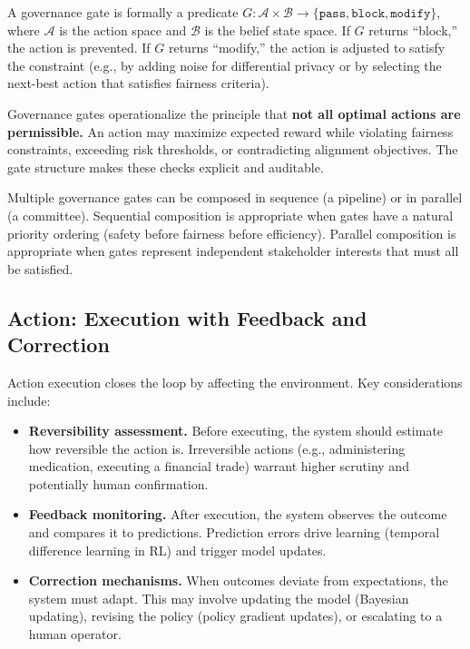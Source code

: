 \documentclass[11pt,a4paper]{article}
\begin{document}
A governance gate is formally a predicate $G: \mathcal{A} \times \mathcal{B} \to \{\texttt{pass}, \texttt{block}, \texttt{modify}\}$, where $\mathcal{A}$ is the action space and $\mathcal{B}$ is the belief state space. If $G$ returns ``block,'' the action is prevented. If $G$ returns ``modify,'' the action is adjusted to satisfy the constraint (e.g., by adding noise for differential privacy or by selecting the next-best action that satisfies fairness criteria).

Governance gates operationalize the principle that \textbf{not all optimal actions are permissible.} An action may maximize expected reward while violating fairness constraints, exceeding risk thresholds, or contradicting alignment objectives. The gate structure makes these checks explicit and auditable.

Multiple governance gates can be composed in sequence (a pipeline) or in parallel (a committee). Sequential composition is appropriate when gates have a natural priority ordering (safety before fairness before efficiency). Parallel composition is appropriate when gates represent independent stakeholder interests that must all be satisfied.

\subsection{Action: Execution with Feedback and Correction}

Action execution closes the loop by affecting the environment. Key considerations include:

\begin{itemize}[leftmargin=*, itemsep=2pt]
  \item \textbf{Reversibility assessment.} Before executing, the system should estimate how reversible the action is. Irreversible actions (e.g., administering medication, executing a financial trade) warrant higher scrutiny and potentially human confirmation.
  \item \textbf{Feedback monitoring.} After execution, the system observes the outcome and compares it to predictions. Prediction errors drive learning (temporal difference learning in RL) and trigger model updates.
  \item \textbf{Correction mechanisms.} When outcomes deviate from expectations, the system must adapt. This may involve updating the model (Bayesian updating), revising the policy (policy gradient updates), or escalating to a human operator.
\end{itemize}
\end{document}

